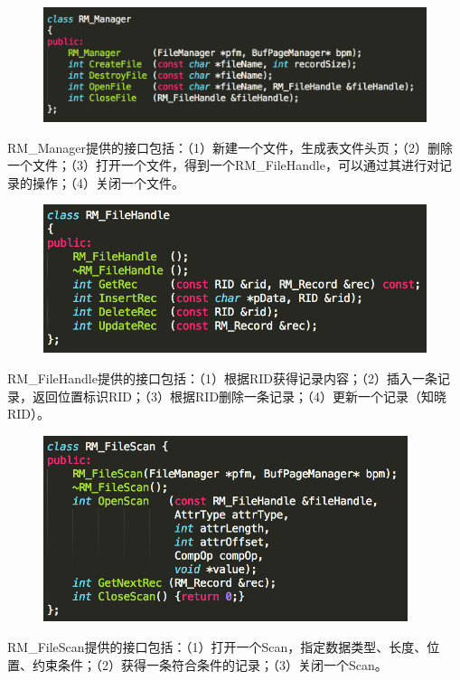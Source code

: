 \begin{figure}[H]
\centering
\includegraphics[width=5in]{Figures/RM_Manager.png}
\end{figure}

RM\_Manager提供的接口包括：（1）新建一个文件，生成表文件头页；（2）删除一个文件；（3）打开一个文件，得到一个RM\_FileHandle，可以通过其进行对记录的操作；（4）关闭一个文件。

\begin{figure}[H]
\centering
\includegraphics[width=4.5in]{Figures/RM_FileHandle.png}
\end{figure}

RM\_FileHandle提供的接口包括：（1）根据RID获得记录内容；（2）插入一条记录，返回位置标识RID；（3）根据RID删除一条记录；（4）更新一个记录（知晓RID）。

\begin{figure}[H]
\centering
\includegraphics[width=4.2in]{Figures/RM_FileScan.png}
\end{figure}

RM\_FileScan提供的接口包括：（1）打开一个Scan，指定数据类型、长度、位置、约束条件；（2）获得一条符合条件的记录；（3）关闭一个Scan。

